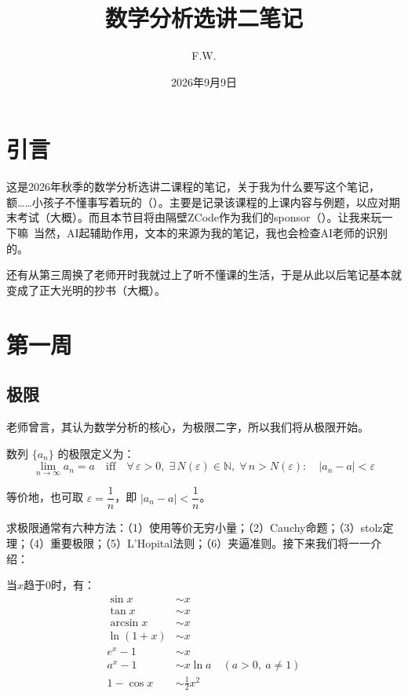\documentclass[lang=cn,chinesefont=founder,10pt]{elegantbook}
\title{数学分析选讲二笔记}
\author{F.W.}
\date{2026年9月9日}
\begin{document}
\maketitle

\frontmatter

\chapter{引言}
这是2026年秋季的数学分析选讲二课程的笔记，关于我为什么要写这个笔记，额……小孩子不懂事写着玩的（）。主要是记录该课程的上课内容与例题，以应对期末考试（大概）。而且本节目将由隔壁ZCode作为我们的sponsor（）。让我来玩一下嘛~当然，AI起辅助作用，文本的来源为我的笔记，我也会检查AI老师的识别的。

还有从第三周换了老师开时我就过上了听不懂课的生活，于是从此以后笔记基本就变成了正大光明的抄书（大概）。

\tableofcontents
\mainmatter
\chapter{第一周}
\section{极限}
老师曾言，其认为数学分析的核心，为极限二字，所以我们将从极限开始。
\begin{definition}[数列的极限]
    数列 $\{a_n\}$ 的极限定义为：
    \[
        \lim_{n \to \infty} a_n = a \quad \text{iff} \quad
        \forall\, \varepsilon > 0,\; \exists\, N(\varepsilon) \in \mathbb{N} ,\;
        \forall\, n > N(\varepsilon):\quad |a_n - a| < \varepsilon
    \]
\end{definition}

\begin{remark}
    等价地，也可取 $\varepsilon = \dfrac{1}{n}$，即 $|a_n - a| < \dfrac{1}{n}$。
\end{remark}
求极限通常有六种方法：（1）使用等价无穷小量；（2）Cauchy命题；（3）stolz定理；（4）重要极限；（5）L'Hopital法则；（6）夹逼准则。接下来我们将一一介绍：

\begin{theorem}[常用等价无穷小量]
    当$x$趋于$0$时，有：
    \begin{align*}
        \sin x &\sim x \\
        \tan x &\sim x \\
        \arcsin x &\sim x \\
        \ln(1+x) &\sim x \\
        e^x - 1 &\sim x \\
        a^x - 1 &\sim x \ln a \quad (a>0,\ a\neq 1) \\
        1 - \cos x &\sim \frac{1}{2}x^2 \\
    \end{align*}
\end{theorem}
\end{document}
